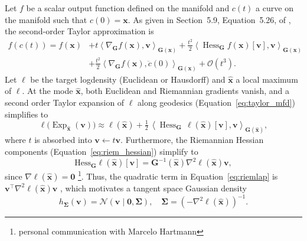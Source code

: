 Let $f$ be a scalar output function defined on the manifold and $c(t)$ a curve on the manifold such that $c(0)= \boldsymbol{x}$. As given in Section~5.9, Equation~5.26, of \citet{Boumal2023}, the second-order Taylor approximation is
\begin{equation} \label{eq:taylor_mfd}
    \begin{aligned}
    f(c(t)) = f(\boldsymbol{x})
&+ t \left\langle \nabla_{\mathbf{G}} f(\boldsymbol{x}), \boldsymbol{v} \right\rangle_{\mathbf{G}(\boldsymbol{x})}
+ \frac{t^2}{2} \left\langle \operatorname{Hess}_{\mathbf{G}} f(\boldsymbol{x})[\boldsymbol{v}], \boldsymbol{v} \right\rangle_{\mathbf{G}(\boldsymbol{x})} \\
&+ \frac{t^2}{2} \left\langle \nabla_{\mathbf{G}} f(\boldsymbol{x}), \ddot{c}(0) \right\rangle_{\mathbf{G}(\boldsymbol{x})}
+ \mathcal{O}(t^3).        
    \end{aligned}
\end{equation}
Let $\ell$ be the target logdensity (Euclidean or Hausdorff) and $\hat{\boldsymbol{x}}$ a local maximum of $\ell$. 
At the mode $\hat{\boldsymbol{x}}$, both Euclidean and Riemannian gradients vanish, and a second order Taylor expansion of $\ell$ along geodesics (Equation~\ref{eq:taylor_mfd})  simplifies to
\begin{equation}\label{eq:riemlap}
\ell\big(\operatorname{Exp}_{\hat{\boldsymbol{x}}}(\boldsymbol{v})\big)
\approx \ell(\hat{\boldsymbol{x}})
+ \tfrac{1}{2}\, 
\left\langle
\operatorname{Hess}_{\mathbf{G}}\,\ell(\hat{\boldsymbol{x}})[\boldsymbol{v}],
\boldsymbol{v}
\right\rangle_{\mathbf{G}(\boldsymbol{\hat{x}})},
\end{equation}
where $t$ is absorbed into $\boldsymbol{v}\gets t \boldsymbol{v}$. 
Furthermore, the Riemannian Hessian components (Equation~\ref{eq:riem_hessian}) simplify to
\begin{equation*}
 \mathrm{Hess}_{\mathbf{G}} \ell(\boldsymbol{\hat{x}}) [\boldsymbol{v}] = \mathbf{G}^{-1}(\boldsymbol{\hat{x}})\nabla^2\ell ({\boldsymbol{\hat{x}}}) \boldsymbol{v},
\end{equation*}
since $\nabla \ell(\hat{\boldsymbol{x}}) = \boldsymbol{0}$ \footnote{personal communication with Marcelo Hartmann}.
Thus, the quadratic term in Equation~\ref{eq:riemlap} is 
$\boldsymbol{v}^{\top}\nabla^2\ell(\hat{\boldsymbol{x}})\boldsymbol{v}$
, which motivates a tangent space Gaussian density
\begin{equation*}
 h_{\mathbf{\Sigma}}(\boldsymbol{v})=\mathcal{N}(\boldsymbol{v}\mid\boldsymbol{0}, \mathbf\Sigma), \quad   \mathbf\Sigma = \left(-\nabla^2\ell(\hat{\boldsymbol{x}})\right)^{-1}. 
\end{equation*} 
